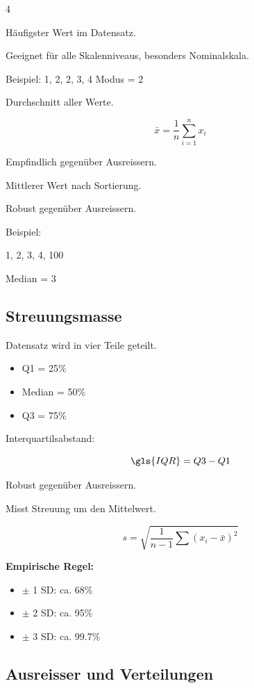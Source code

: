 \begin{landscape}
\begin{multicols*}{4}
\begin{cheatSheetBox}[title=Modus]
Häufigster Wert im Datensatz.

Geeignet für alle Skalenniveaus, besonders Nominalskala.

Beispiel: 1, 2, 2, 3, 4
Modus = 2
\end{cheatSheetBox}

\begin{cheatSheetBox}[title=Mittelwert]
Durchschnitt aller Werte.

\[
\bar{x} = \frac{1}{n}\sum_{i=1}^{n} x_i
\]

Empfindlich gegenüber Ausreissern.
\end{cheatSheetBox}

\begin{cheatSheetBox}[title=Median]
Mittlerer Wert nach Sortierung.

Robust gegenüber Ausreissern.

Beispiel:

1, 2, 3, 4, 100

Median = 3
\end{cheatSheetBox}
\textcolor{\cheatSheetColor}{\subsection*{Streuungsmasse}}

\begin{cheatSheetBox}[title=Quartile]
Datensatz wird in vier Teile geteilt.

\begin{itemize}
\item Q1 = 25\%
\item Median = 50\%
\item Q3 = 75\%
\end{itemize}
\end{cheatSheetBox}

\begin{cheatSheetBox}[title=Quartilsabstand]
Interquartilsabstand:

\[
\gls{IQR} = Q3 - Q1
\]

Robust gegenüber Ausreissern.
\end{cheatSheetBox}

\begin{cheatSheetBox}[title=Standardabweichung]

Misst Streuung um den Mittelwert.

\[
s = \sqrt{\frac{1}{n-1}\sum (x_i-\bar{x})^2}
\]

\textbf{Empirische Regel:}
\begin{itemize}
\item $\pm$ 1 \gls{SD}: ca. 68\%
\item $\pm$ 2 \gls{SD}: ca. 95\%
\item $\pm$ 3 \gls{SD}: ca. 99.7\%
\end{itemize}
\end{cheatSheetBox}
\columnbreak
\textcolor{\cheatSheetColor}{\subsection*{Ausreisser und Verteilungen}}


\end{multicols*}
\end{landscape}
